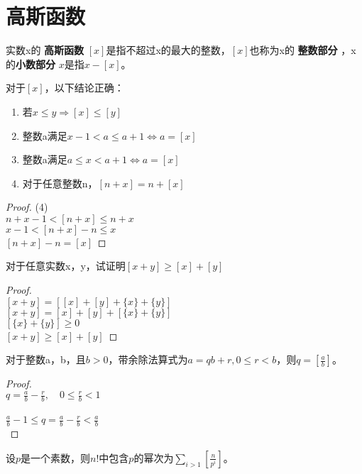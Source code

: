 \documentclass[cn,10pt]{elegantbook}
\begin{document}
\section{高斯函数}
\begin{definition}
  实数x的 \textbf{高斯函数} $[x]$是指不超过x的最大的整数，$[x]$也称为x的 \textbf{整数部分} ，x的\textbf{小数部分} ${x}$是指$x-[x]$。
\end{definition}

\begin{theorem}
  对于$[x]$，以下结论正确：
  \begin{enumerate}
    \item 若$x \leq y \Rightarrow [x] \leq [y]$
    \item 整数a满足$x-1<a \leq a+1 \Leftrightarrow a = [x]$
    \item 整数a满足$a \leq x <a+1 \Leftrightarrow a= [x]$
    \item 对于任意整数n，$[n+x]=n+[x]$
  \end{enumerate}
\end{theorem}
\begin{proof}
  (4)\\$n+x-1<[n+x] \leq n+x$
  \\$x-1<[n+x]-n \leq x$
  \\$[n+x]-n = [x]$
\end{proof}
\begin{example}
  对于任意实数x，y，试证明$[x+y] \geq [x]+[y]$
\end{example}
\begin{proof}
  \\
  $[x+y] = [[x]+[y]+\{x\}+\{y\}]$\\
  $[x+y] = [x]+[y]+[\{x\}+\{y\}]$\\
  $[\{x\}+\{y\}] \geq 0$\\
  $[x+y] \geq [x]+[y]$
\end{proof}
\begin{theorem}
  对于整数a，b，且$b>0$，带余除法算式为$a = qb +r, 0 \leq r <b$，则$q = [ \frac{a}{b}]$。
\end{theorem}
\begin{proof}
  \\$q = \frac{a}{b}- \frac{r}{b},\quad 0 \leq \frac{r}{b} <1$\\
  \\$\frac{a}{b} -1 \leq q = \frac{a}{b}- \frac{r}{b} < \frac{a}{b}$\\
\end{proof}
\begin{theorem}
  设$p$是一个素数，则$n!$中包含$p$的幂次为$\sum_{i>1}[\frac{n}{p^i}]$。
\end{theorem}
\end{document}

